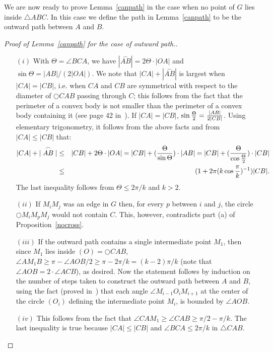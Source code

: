 \documentclass{stacs_proc}
\theoremstyle{plain}\newtheorem{satz}[thm]{Satz}
\begin{document}
We are now ready to prove Lemma~\ref{canpath} in the case when no
point of $G$ lies inside $\triangle{ABC}$. In this case we define
the path in Lemma~\ref{canpath} to be the outward path between $A$
and $B$.
\begin{proof}[Proof of Lemma~\ref{canpath} for the case of outward
path.]
\begin{itemize}
\item[]
\item[$(i)$] With $\Theta = \angle{BCA}$, we have $|\stackrel{\frown}{AB}| =
2 \Theta \cdot |OA|$ and $\sin{\Theta}= {|AB| / (2|OA|)}$. We note that
$|CA|+|\stackrel{\frown}{AB}|$ is largest
when $|CA| = |CB|$, i.e. when $CA$ and $CB$ are symmetrical with
respect to the diameter of $\bigcirc{CAB}$ passing through $C$; this
follows from the fact that the perimeter of a
convex body is not smaller than the perimeter of a convex body
containing it (see page 42 in~\cite{bookconvexity}). If $|CA| = |CB|$,
$\sin{\Theta \over 2} = {|AB| \over 2|CB|}$. Using elementary
trigonometry, it follows from the above facts and from
$|CA| \leq |CB|$ that:
\begin{eqnarray*}
|CA|+|\stackrel{\frown}{AB}| &   \leq & |CB|+2 \Theta \cdot |OA| =
|CB|+ ({\Theta \over \sin{\Theta}}) \cdot |AB| =  |CB| + ({\Theta
\over \cos{\Theta \over 2}}) \cdot |CB| \\
		 & \leq & (1+2\pi(k\cos{\frac{\pi}{k}})^{-1})|CB|.
\end{eqnarray*}
The last inequality follows from $\Theta \leq 2\pi/k$ and $k
> 2$.

\item[$(ii)$] If $M_iM_j$ was an edge in $G$ then, for every $p$ between $i$
and $j$, the circle $\bigcirc{M_iM_pM_j}$ would not contain $C$. This,
however, contradicts part (a) of Proposition~\ref{nocross}.

\item[$(iii)$] If the outward path contains a single intermediate point $M_1$,
then since $M_1$ lies inside $(O)=\bigcirc{CAB}$, $\angle{AM_1B}
\geq \pi - \angle{AOB}/2 \geq \pi - 2\pi/k = (k-2)\pi/k$ (note that
$\angle{AOB} = 2 \cdot \angle{ACB}$), as desired. Now the statement
follows by induction on the number of steps taken to construct the
outward path between $A$ and $B$, using the fact (proved
in~\cite{keil}) that each angle $\angle{M_{i-1}O_iM_{i+1}}$ at the
center of the circle $(O_i)$ defining the intermediate point $M_i$,
is bounded by $\angle{AOB}$.
\item[$(iv)$] This follows from the fact that $\angle{CAM_1} \geq
\angle{CAB} \geq \pi/2 - \pi/k$. The last inequality is true
because $|CA| \leq |CB|$ and $\angle{BCA} \leq 2\pi/k$ in
$\triangle{CAB}$.
\end{itemize}
\end{proof}
\end{document}
